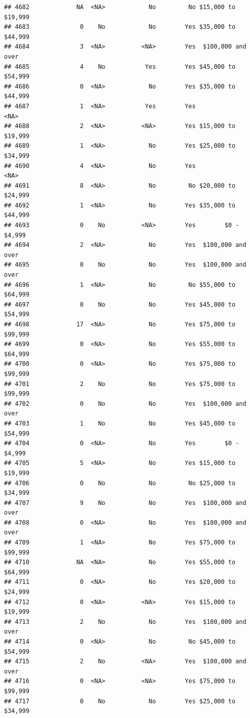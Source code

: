 \documentclass[man]{apa6}
\begin{document}
\begin{verbatim}
## 4682             NA  <NA>            No         No $15,000 to $19,999
## 4683              0    No            No        Yes $35,000 to $44,999
## 4684              3  <NA>          <NA>        Yes  $100,000 and over
## 4685              4    No           Yes        Yes $45,000 to $54,999
## 4686              0  <NA>            No        Yes $35,000 to $44,999
## 4687              1  <NA>           Yes        Yes               <NA>
## 4688              2  <NA>          <NA>        Yes $15,000 to $19,999
## 4689              1  <NA>            No        Yes $25,000 to $34,999
## 4690              4  <NA>            No        Yes               <NA>
## 4691              8  <NA>            No         No $20,000 to $24,999
## 4692              1  <NA>            No        Yes $35,000 to $44,999
## 4693              0    No          <NA>        Yes        $0 - $4,999
## 4694              2  <NA>            No        Yes  $100,000 and over
## 4695              0    No            No        Yes  $100,000 and over
## 4696              1  <NA>            No         No $55,000 to $64,999
## 4697              0    No            No        Yes $45,000 to $54,999
## 4698             17  <NA>            No        Yes $75,000 to $99,999
## 4699              0  <NA>            No        Yes $55,000 to $64,999
## 4700              0  <NA>            No        Yes $75,000 to $99,999
## 4701              2    No            No        Yes $75,000 to $99,999
## 4702              0    No            No        Yes  $100,000 and over
## 4703              1    No            No        Yes $45,000 to $54,999
## 4704              0  <NA>            No        Yes        $0 - $4,999
## 4705              5  <NA>            No        Yes $15,000 to $19,999
## 4706              0    No            No         No $25,000 to $34,999
## 4707              9    No            No        Yes  $100,000 and over
## 4708              0  <NA>            No        Yes  $100,000 and over
## 4709              1  <NA>            No        Yes $75,000 to $99,999
## 4710             NA  <NA>            No        Yes $55,000 to $64,999
## 4711              0  <NA>            No        Yes $20,000 to $24,999
## 4712              0  <NA>          <NA>        Yes $15,000 to $19,999
## 4713              2    No            No        Yes  $100,000 and over
## 4714              0  <NA>            No         No $45,000 to $54,999
## 4715              2    No          <NA>        Yes  $100,000 and over
## 4716              0  <NA>          <NA>        Yes $75,000 to $99,999
## 4717              0    No            No        Yes $25,000 to $34,999

\end{verbatim}
\end{document}

